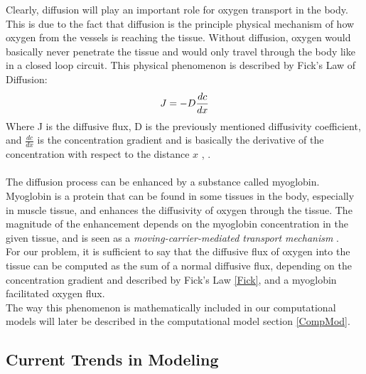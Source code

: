 Clearly, diffusion will play an important role for oxygen transport in the body. This is due to the fact that diffusion is the principle physical mechanism of how oxygen from the vessels is reaching the tissue. Without diffusion, oxygen would basically never penetrate the tissue and would only travel through the body like in a closed loop circuit. This physical phenomenon is described by Fick's Law of Diffusion:
\begin{equation}
\\J = - D \frac{dc}{dx}
\label{Fick}
\end{equation}
Where J is the diffusive flux, D is the previously mentioned diffusivity coefficient, and $\frac{dc}{dx}$ is the concentration gradient and is basically the derivative of the concentration with respect to the distance $x$ \cite{lee2017accounting}, \cite{pittman2011regulation}.\\
\\The diffusion process can be enhanced by a substance called myoglobin. Myoglobin is a protein that can be found in some tissues in the body, especially in muscle tissue, and enhances the diffusivity of oxygen through the tissue. The magnitude of the enhancement depends on the myoglobin concentration in the given tissue, and is seen as a \emph{moving-carrier-mediated transport mechanism} \cite{wittenberg1970myoglobin}.
\\For our problem, it is sufficient to say that the diffusive flux of oxygen into the tissue can be computed as the sum of a normal diffusive flux, depending on the concentration gradient and described by Fick's Law \ref{Fick}, and a myoglobin facilitated oxygen flux.
\\The way this phenomenon is mathematically included in our computational models will later be described in the computational model section \ref{CompMod}.

\newpage
\subsection{Current Trends in Modeling}

